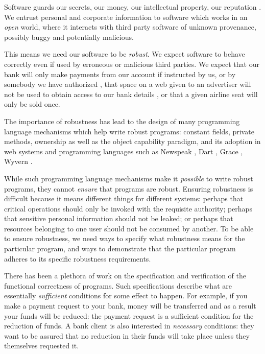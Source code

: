 Software guards our secrets, our money, our intellectual property,
our reputation \cite{covern}.  We entrust personal and
corporate information to software which works in an \emph{open} world, 
where  it interacts with %
third party software of unknown provenance, possibly buggy and potentially malicious.

This means we need our software to be \emph{robust}.
We expect software to behave correctly even if  used 
by erroneous or malicious third parties.
 We expect that our bank will only make payments 
from our account if instructed by us, or by somebody we have authorized \cite{ERC20}, 
that space on a web given to an advertiser will not be used
to obtain access to our bank details \cite{cwe}, or that a given
airline seat will only be sold once. 

The importance of robustness has lead to the design of many programming
language mechanisms which help write robust programs:
constant fields, private methods, ownership\cite{ownalias}
as well as the object capability paradigm\cite{MillerPhD},
and its adoption in  web systems
\cite{CapJavaHayesAPLAS17,CapNetSocc17Eide,DOCaT14} and programming languages such as Newspeak
\cite{newspeak17}, Dart \cite{dart15}, Grace \cite{grace,graceClasses}, Wyvern \cite{wyverncapabilities}.

While such programming language mechanisms make it \textit{possible} to write robust
programs, they cannot \textit{ensure} that programs are robust.
Ensuring robustness is difficult because it means 
different things for different systems: perhaps
that critical operations should only be invoked with the requisite authority;
perhaps that sensitive personal information should not be leaked; 
or perhaps that resources belonging to one user should not be consumed by another.
%
To be able to ensure robustness, we need ways to specify what robustness means for the 
particular program, and ways to demonstrate that the particular program 
adheres to its specific robustness requirements.

There has been a plethora of work on the specification and verification of the
functional correctness of programs. Such specifications describe what are
essentially \emph{sufficient} conditions for some
effect to happen. For example, if you make a payment request to your bank, money will be transferred
and as a result your funds will be reduced: the payment request is a sufficient condition for the
reduction of funds. A bank client is also interested in \emph{necessary} conditions:
they want to be assured that no reduction in their funds will take place unless they themselves
requested it.

